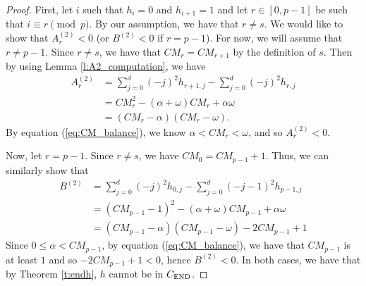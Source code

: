 \documentclass[12pt]{amsart}
\theoremstyle{definition}
\numberwithin{equation}{section}
\renewcommand\>{\rangle}
\newcommand\<{\langle}
\newcommand\0{\mathbf{0}}
\newcommand{\CEND}{C_\textnormal{END}}
\begin{document}
\begin{proof}
	First, let $i$ such that $h_{i} = 0$ and $h_{i+1} = 1$ and let $r \in [0,p-1]$ be such that $i \equiv r \pmod p$. By our assumption, we have that $r \neq s$.
	We would like to show that $A_{r}^{(2)} < 0$ (or $B^{(2)} < 0$ if $r = p-1$). 
	For now, we will assume that $r \neq p-1$.
	Since $r \neq s$, we have that $CM_{r} = CM_{r+1}$ by the definition of $s$. Then by using Lemma \ref{l:A2_computation}, we have 
	\begin{align*}
		A_{r}^{(2)} &= \sum_{j=0}^d (-j)^2 h_{r+1,j} - \sum_{j=0}^d (-j)^2 h_{r,j}\\
		&=  CM_{r}^2 -  (\alpha + \omega)CM_{r} + \alpha\omega\\
		&= (CM_{r}-\alpha)(CM_{r}-\omega).
	\end{align*}
	By equation (\ref{eq:CM_balance}), we know $\alpha < CM_r < \omega$, and so $A_{r}^{(2)} < 0$.
	
	Now, let $r = p-1$. Since $r \neq s$, we have $CM_0 = CM_{p-1} + 1$. Thus, we can similarly show that 
	\begin{align*}
		B^{(2)} &= \sum_{j=0}^d (-j)^2 h_{0,j} - \sum_{j=0}^d (-j-1)^2 h_{p-1,j}\\
		&= (CM_{p-1}-1)^2 - (\alpha + \omega)CM_{p-1} + \alpha\omega\\
		&= (CM_{p-1}-\alpha)(CM_{p-1}-\omega) - 2CM_{p-1} + 1
	\end{align*}
	Since $0 \leq \alpha < CM_{p-1}$, by equation (\ref{eq:CM_balance}), we have that $CM_{p-1}$ is at least $1$ and so $-2CM_{p-1} + 1 < 0$, hence $B^{(2)} < 0$.
	In both cases, we have that by Theorem \ref{t:endh}, $h$ cannot be in $\CEND$. 
\end{proof}
\end{document}
